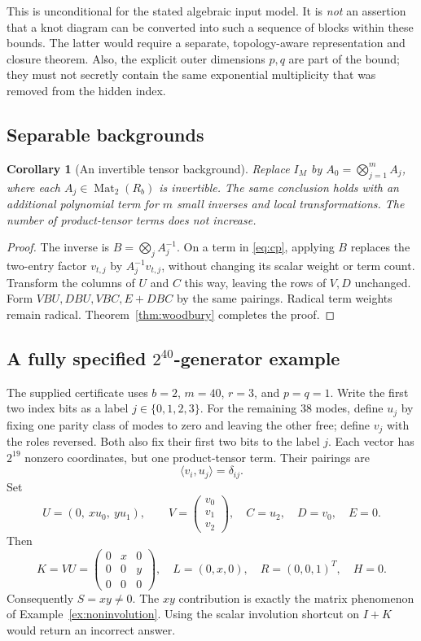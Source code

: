 \documentclass[11pt]{article}
\newtheorem{corollary}[theorem]{Corollary}
\theoremstyle{definition}\newtheorem{definition}[theorem]{Definition}
\theoremstyle{remark}\newtheorem{remark}[theorem]{Remark}
\newcommand{\Mat}{\operatorname{Mat}}
\begin{document}
This is unconditional for the stated algebraic input model. It is \emph{not} an assertion that a knot diagram can be converted into such a sequence of blocks within these bounds. The latter would require a separate, topology-aware representation and closure theorem. Also, the explicit outer dimensions $p,q$ are part of the bound; they must not secretly contain the same exponential multiplicity that was removed from the hidden index.

\subsection{Separable backgrounds}
\begin{corollary}[An invertible tensor background]\label{cor:separable}
Replace $I_M$ by $A_0=\bigotimes_{j=1}^m A_j$, where each $A_j\in\Mat_2(R_b)$ is invertible. The same conclusion holds with an additional polynomial term for $m$ small inverses and local transformations. The number of product-tensor terms does not increase.
\end{corollary}
\begin{proof}
The inverse is $B=\bigotimes_jA_j^{-1}$. On a term in \eqref{eq:cp}, applying $B$ replaces the two-entry factor $v_{t,j}$ by $A_j^{-1}v_{t,j}$, without changing its scalar weight or term count. Transform the columns of $U$ and $C$ this way, leaving the rows of $V,D$ unchanged. Form $VBU,DBU,VBC,E+DBC$ by the same pairings. Radical term weights remain radical. Theorem~\ref{thm:woodbury} completes the proof.
\end{proof}

\subsection{A fully specified \texorpdfstring{$2^{40}$}{2-to-the-40}-generator example}
The supplied certificate uses $b=2$, $m=40$, $r=3$, and $p=q=1$. Write the first two index bits as a label $j\in\{0,1,2,3\}$. For the remaining 38 modes, define $u_j$ by fixing one parity class of modes to zero and leaving the other free; define $v_j$ with the roles reversed. Both also fix their first two bits to the label $j$. Each vector has $2^{19}$ nonzero coordinates, but one product-tensor term. Their pairings are
\[
 \langle v_i,u_j\rangle=\delta_{ij}.
\]
Set
\[
 U=(0,\ xu_0,\ yu_1),\qquad
 V=\begin{pmatrix}v_0\\v_1\\v_2\end{pmatrix},\quad
 C=u_2,\quad D=v_0,\quad E=0.
\]
Then
\[
 K=VU=\begin{pmatrix}0&x&0\\0&0&y\\0&0&0\end{pmatrix},
 \quad L=(0,x,0),\quad R=(0,0,1)^T,\quad H=0.
\]
Consequently $S=xy\ne0$. The $xy$ contribution is exactly the matrix phenomenon of Example~\ref{ex:noninvolution}. Using the scalar involution shortcut on $I+K$ would return an incorrect answer.
\end{document}
